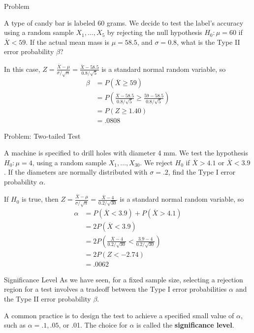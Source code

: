 \documentclass[handout]{beamer}
\renewcommand{\emph}{\textbf}
\begin{document}
\begin{frame}{Problem}
\begin{block}{}
A type of candy bar is labeled 60 grams. We decide to test the label's accuracy using a random sample $X_1,\dots,X_5$ by rejecting the null hypothesis $H_0: \mu=60$ if $\overline X<59$. If the actual mean mass is $\mu=58.5$, and $\sigma=0.8$, what is the Type II error probability $\beta$?
\end{block}

\pause In this case, $Z=\frac{\overline X-\mu}{\sigma/\sqrt{n}}=\frac{\overline X-58.5}{0.8/\sqrt{5}}$ is a standard normal random variable, \pause so
\begin{align*}
\beta &= P(\overline X\geq 59) \\
&= P\left(\frac{\overline X-58.5}{0.8/\sqrt5} \geq \frac{59-58.5}{0.8/\sqrt5}\right)\\
&= P(Z \geq 1.40) \\
&= .0808
\end{align*}

\end{frame}

\begin{frame}{Problem: Two-tailed Test}
\begin{block}{}
A machine is specified to drill holes with diameter 4 mm. We test the hypothesis $H_0: \mu=4$, using a random sample $X_1,\dots,X_{30}$. We reject $H_0$ if $\overline X>4.1$ or $\overline X<3.9$. If the diameters are normally distributed with $\sigma=.2$, find the Type I error probability $\alpha$.
\end{block}

\pause If $H_0$ is true, then $Z=\frac{\overline X-\mu}{\sigma/\sqrt{n}}=\frac{\overline X-4}{0.2/\sqrt{30}}$ is a standard normal random variable, \pause so
\begin{align*}
\alpha &= P(\overline X<3.9)+P(\overline X>4.1) \\
&= 2P(\overline X<3.9) \\
&= 2P\left(\frac{\overline X-4}{0.2/\sqrt{30}} < \frac{3.9-4}{0.2/\sqrt{30}}\right)\\
&= 2P(Z < -2.74) \\
&= .0062
\end{align*}
\end{frame}

\begin{frame}{Significance Level}
As we have seen, for a fixed sample size, selecting a rejection region for a test involves a tradeoff between the Type I error probabilities $\alpha$ and the Type II error probability $\beta$. 

\vspace{.2cm}
\pause A common practice is to design the test to achieve a specified small value of $\alpha$, such as $\alpha=.1, .05$, or .01. The choice for $\alpha$ is called the \emph{significance level}.
\end{frame}
\end{document}
